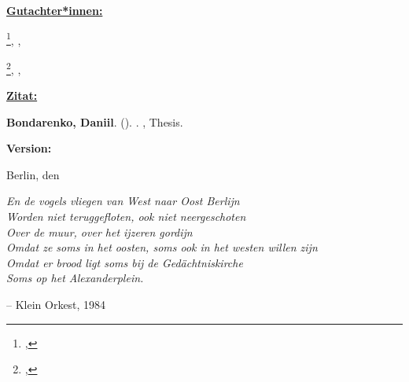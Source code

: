 \begin{titlepage}
    \textbf{\underline{Gutachter*innen:}}\par
    \textbf{\fstAdvisor}%
      \footnote{\fstAdvisorsDepartment,
      \fstAdvisorsAG},
    \fstAdvisorsUniversity,
      \fstAdvisorsCountry\par
    \textbf{\sndAdvisor}%
      \footnote{\sndAdvisorsDepartment,
      \sndAdvisorsAG},
      \sndAdvisorsUniversity,
      \fstAdvisorsCountry
   	\par\vspace{3.5\baselineskip}
    
    \textbf{\underline{Zitat:}}\par 
    \textbf{Bondarenko, Daniil}.
    (\Year).
    \textit{\thetitle}. 
    \university, \thesisKind{} Thesis. \par
    \vspace{2.5\baselineskip}
    
    \textbf{Version:} \versionnumber \par
    \vspace{0.5\baselineskip}
    Berlin, den \thedate\par
    \vfill
\end{titlepage}

\thispagestyle{empty} %



\thispagestyle{empty} %
\setcounter{page}{1}
\vspace*{3cm}
\begin{center}
\begin{minipage}[c]{0.6\paperwidth}%
    \vspace{2ex}
    \textit{En de vogels vliegen van West naar Oost Berlijn} \\
    \textit{Worden niet teruggefloten, ook niet neergeschoten} \\
    \textit{Over de muur, over het ijzeren gordijn} \\
    \textit{Omdat ze soms in het oosten, soms ook in het westen willen zijn} \\
    \textit{Omdat er brood ligt soms bij de Gedächtniskirche} \\
    \textit{Soms op het Alexanderplein.} \par
    \vspace{2ex}
    \hfill -- Klein Orkest, 1984
  \end{minipage}
\end{center}